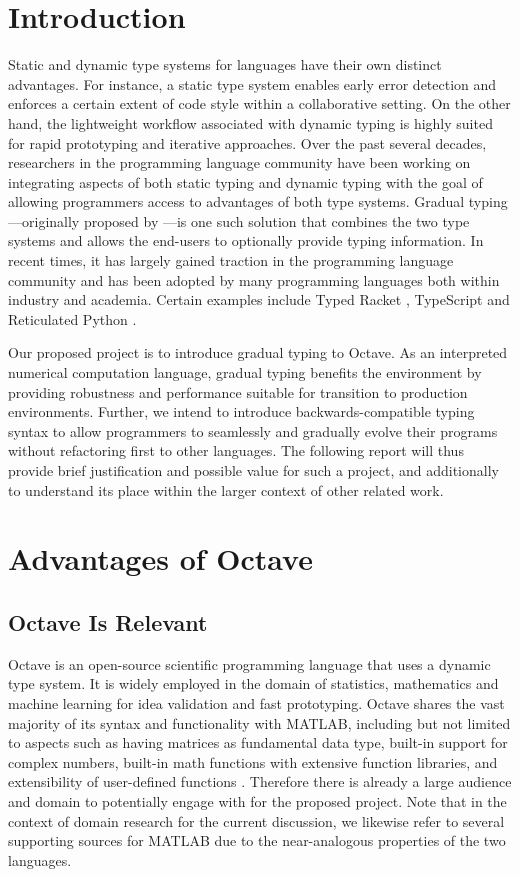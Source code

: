 \section{Introduction}
Static and dynamic type systems for languages have their own distinct advantages. For instance, a static type system enables early error detection and enforces a certain extent of code style within a collaborative setting. On the other hand, the lightweight workflow associated with dynamic typing is highly suited for rapid prototyping and iterative approaches. Over the past several decades, researchers in the programming language community have been working on integrating aspects of both static typing and dynamic typing with the goal of allowing programmers access to advantages of both type systems. Gradual typing---originally proposed by \citet{siek2006gradual}---is one such solution that combines the two type systems and allows the end-users to optionally provide typing information. In recent times, it has largely gained traction in the programming language community and has been adopted by many programming languages both within industry and academia. Certain examples include Typed Racket \cite{tobin2006interlanguage}, TypeScript \cite{bierman2014understanding} and Reticulated Python \cite{vitousek2014design}.

Our proposed project is to introduce gradual typing to Octave. As an interpreted numerical computation language, gradual typing benefits the environment by providing robustness and performance suitable for transition to production environments. Further, we intend to introduce backwards-compatible typing syntax to allow programmers to seamlessly and gradually evolve their programs without refactoring first to other languages. The following report will thus provide brief justification and possible value for such a project, and additionally to understand its place within the larger context of other related work.

\section{Advantages of Octave}
\subsection{Octave Is Relevant}
Octave is an open-source scientific programming language that uses a dynamic type system. It is widely employed in the domain of statistics, mathematics and machine learning for idea validation and fast prototyping. Octave shares the vast majority of its syntax and functionality with MATLAB, including but not limited to aspects such as having matrices as fundamental data type, built-in support for complex numbers, built-in math functions with extensive function libraries, and extensibility of user-defined functions \cite{wikibooks}. Therefore there is already a large audience and domain to potentially engage with for the proposed project. Note that in the context of domain research for the current discussion, we likewise refer to several supporting sources for MATLAB due to the near-analogous properties of the two languages.

